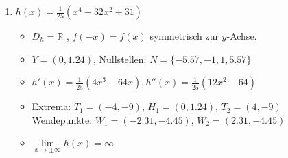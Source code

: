 \begin{enumerate}
\begin{enumerate}
              \item $h(x) = \frac{1}{25}(x^4 - 32x^2 + 31)$
                    \begin{itemize}
                        \item $D_h = \mathbb{R}$ , $f(-x) = f(x)$ symmetrisch zur $y$-Achse.
                        \item $Y = (0, 1.24)$, Nullstellen: $N = \{-5.57, -1, 1, 5.57\}$
                        \item $h'(x) = \frac{1}{25}(4x^3 - 64x), h''(x)= \frac{1}{25}(12x^2 - 64)$
                        \item Extrema: $T_1 = (-4, -9)$, $H_1 = (0, 1.24)$, $T_2 = (4, -9)$ \\
                              Wendepunkte: $W_1 = (-2.31, -4.45)$, $W_2 = (2.31, -4.45)$
                        \item $\lim\limits_{x \to \pm\infty} h(x) = \infty$
                    \end{itemize}
          \end{enumerate}



\end{enumerate}
